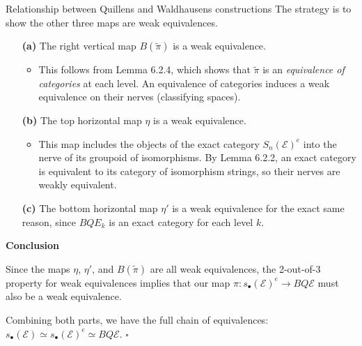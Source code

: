 \documentclass[10pt]{beamer}
\begin{document}
\begin{frame}{Relationship between Quillens and Waldhausens constructions}
	The strategy is to show the other three maps are weak equivalences.
	
	\begin{enumerate}
		\item[\textbf{(a)}] The right vertical map $B(\tilde{\pi})$ is a weak equivalence.
		\begin{itemize}
			\item This follows from Lemma 6.2.4, which shows that $\tilde{\pi}$ is an \textit{equivalence of categories} at each level. An equivalence of categories induces a weak equivalence on their nerves (classifying spaces).
		\end{itemize}
		
		
		
		\item[\textbf{(b)}] The top horizontal map $\eta$ is a weak equivalence.
		\begin{itemize}
			\item This map includes the objects of the exact category $S_n(\mathcal{E})^e$ into the nerve of its groupoid of isomorphisms. By Lemma 6.2.2, an exact category is equivalent to its category of isomorphism strings, so their nerves are weakly equivalent.
		\end{itemize}
		
		\item[\textbf{(c)}] The bottom horizontal map $\eta'$ is a weak equivalence for the exact same reason, since $BQE_k$ is an exact category for each level $k$.
	\end{enumerate}
	
	
	
	\textbf{Conclusion}
	
	Since the maps $\eta$, $\eta'$, and $B(\tilde{\pi})$ are all weak equivalences, the 2-out-of-3 property for weak equivalences implies that our map $\pi: s_\bullet(\mathcal{E})^e \to BQ\mathcal{E}$ must also be a weak equivalence.
	
	Combining both parts, we have the full chain of equivalences: $ s_\bullet(\mathcal{E}) \simeq s_\bullet(\mathcal{E})^e \simeq BQ\mathcal{E} $.
	\hfill \( \square \)
\end{frame}
\end{document}
